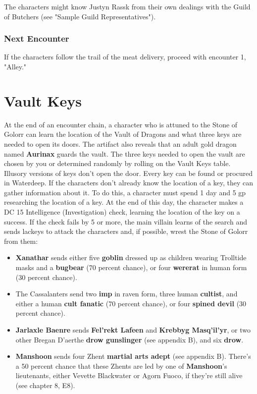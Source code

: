 \documentclass[10pt,a4paper,twoside,twocolumn,openany,nodeprecatedcode]{dndbook}
\begin{document}
The characters might know Justyn Rassk from their own dealings with the Guild of Butchers (see "Sample Guild Representatives").
\subsubsection{Next Encounter}
If the characters follow the trail of the meat delivery, proceed with encounter 1, "Alley."
\section{Vault Keys}
At the end of an encounter chain, a character who is attuned to the Stone of Golorr can learn the location of the Vault of Dragons and what three keys are needed to open its doors. The artifact also reveals that an adult gold dragon named \textbf{Aurinax} guards the vault.
The three keys needed to open the vault are chosen by you or determined randomly by rolling on the Vault Keys table. Illusory versions of keys don't open the door.
Every key can be found or procured in Waterdeep. If the characters don't already know the location of a key, they can gather information about it. To do this, a character must spend 1 day and 5 gp researching the location of a key. At the end of this day, the character makes a DC 15 Intelligence (Investigation) check, learning the location of the key on a success. If the check fails by 5 or more, the main villain learns of the search and sends lackeys to attack the characters and, if possible, wrest the Stone of Golorr from them:
\begin{itemize}

\item \textbf{Xanathar} sends either five \textbf{goblin} dressed up as children wearing Trolltide masks and a \textbf{bugbear} (70 percent chance), or four \textbf{wererat} in human form (30 percent chance).
\item The Cassalanters send two \textbf{imp} in raven form, three human \textbf{cultist}, and either a human \textbf{cult fanatic} (70 percent chance), or four \textbf{spined devil} (30 percent chance).
\item \textbf{Jarlaxle Baenre} sends \textbf{Fel'rekt Lafeen} and \textbf{Krebbyg Masq'il'yr}, or two other Bregan D'aerthe \textbf{drow gunslinger} (see appendix B), and six \textbf{drow}.
\item \textbf{Manshoon} sends four Zhent \textbf{martial arts adept} (see appendix B). There's a 50 percent chance that these Zhents are led by one of \textbf{Manshoon}'s lieutenants, either Vevette Blackwater or Agorn Fuoco, if they're still alive (see chapter 8, E8).
\end{itemize}
\end{document}
